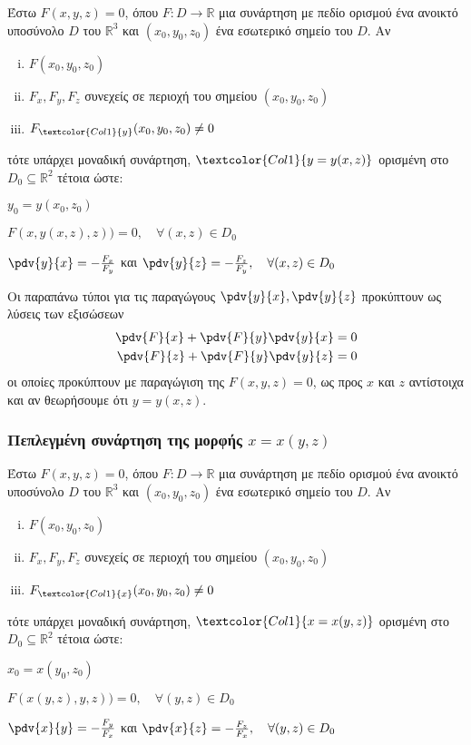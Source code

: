 \documentclass[a4paper,table]{report}
\begin{document}
Έστω $ F(x,y,z) = 0 $, όπου $F\colon D \to \mathbb{R}$ μια συνάρτηση με πεδίο ορισμού 
ένα ανοικτό υποσύνολο $ D $ του $ \mathbb{R}^{3}  $ και $ (x_0,y_0,z_0) $ ένα 
εσωτερικό σημείο του $ D $. Αν
\begin{enumerate}[(i)]
  \item $ F(x_0,y_0,z_0) $
  \item $ F_x, F_y, F_z $ συνεχείς σε περιοχή του σημείου $ (x_0,y_0,z_0) $
  \item $ F_{\textcolor{Col1}{y}}(x_0,y_0,z_0) \neq 0 $
\end{enumerate}
τότε υπάρχει μοναδική συνάρτηση, $ \textcolor{Col1}{y=y(x,z)} $ ορισμένη στο 
$ D_0 \subseteq \mathbb{R}^{2} $ τέτοια ώστε:
\begin{myitemize}
  \item $ y_0 = y(x_0,z_0) $
  \item $ F(x,y(x,z),z)) = 0,  \quad \forall (x,z) \in  D_0 $
  \item $ \pdv{y}{x} = - \frac{F_x}{F_y} $ και $ \pdv{y}{z} = - \frac{F_z}{F_y}, 
    \quad \forall (x,z) \in D_0$
\end{myitemize}

\begin{rem}
  Οι παραπάνω τύποι για τις παραγώγους $ \pdv{y}{x}, \pdv{y}{z} $ προκύπτουν 
  ως λύσεις των εξισώσεων  
  \begin{align*}	
    \pdv{F}{x} + \pdv{F}{y}\pdv{y}{x} &= 0 \\
    \pdv{F}{z} + \pdv{F}{y}\pdv{y}{z} &= 0 
  \end{align*}
  οι οποίες προκύπτουν με παραγώγιση της $ F(x,y,z) = 0 $, ως προς $x$ και $z$ 
  αντίστοιχα και  αν θεωρήσουμε ότι $ y=y(x,z) $.
\end{rem}

\subsubsection{Πεπλεγμένη συνάρτηση της μορφής \ensuremath{x=x(y,z)}}

Έστω $ F(x,y,z) = 0 $, όπου $F\colon D \to \mathbb{R}$ μια συνάρτηση με πεδίο ορισμού 
ένα ανοικτό υποσύνολο $ D $ του $ \mathbb{R}^{3}  $ και $ (x_0,y_0,z_0) $ ένα 
εσωτερικό σημείο του $ D $. Αν
\begin{enumerate}[(i)]
  \item $ F(x_0,y_0,z_0) $
  \item $ F_x, F_y, F_z $ συνεχείς σε περιοχή του σημείου $ (x_0,y_0,z_0) $
  \item $ F_{\textcolor{Col1}{x}}(x_0,y_0,z_0) \neq 0 $
\end{enumerate}
τότε υπάρχει μοναδική συνάρτηση, $ \textcolor{Col1}{x=x(y,z)} $ ορισμένη στο 
$ D_0 \subseteq \mathbb{R}^{2} $ τέτοια ώστε:
\begin{myitemize}
  \item $ x_0 = x(y_0,z_0) $
  \item $ F(x(y,z),y,z)) = 0,  \quad \forall (y,z) \in  D_0 $
  \item $ \pdv{x}{y} = - \frac{F_y}{F_x} $ και $ \pdv{x}{z} = - \frac{F_z}{F_x}, 
    \quad \forall (y,z) \in D_0$
\end{myitemize}
\end{document}
